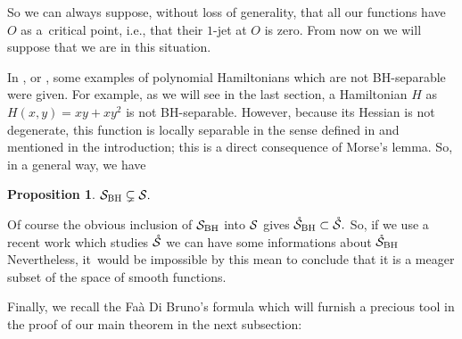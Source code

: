 \documentclass[pdftex]{sigma}%
\numberwithin{equation}{section}
\newtheorem{Proposition}[Theorem]{Proposition}
 { \theoremstyle{definition}
\newtheorem{Remark}[Theorem]{Remark} }
\begin{document}
So we can always suppose, without loss of generality, that all our functions have $O$ as a~critical point, i.e., that their $1$-jet at $O$ is zero.
From now on we will suppose that we are in this situation.

In \cite{Br,BrMoTu}, or \cite{Fe}, some examples of polynomial Hamiltonians which are not BH-separable were given. For example, as we will see in the last section, a Hamiltonian $H$ as
$H(x,y)=xy+xy^2$ is not BH-separable. However, because its Hessian is not degenerate, this function is locally separable in the sense defined in \cite{BouBr} and mentioned in the introduction; this is a direct consequence of Morse's lemma. So, in a general way, we have

\begin{Proposition}
	${\cal S}_{\rm BH}\subsetneq{\cal S}.$
\end{Proposition}

\begin{Remark}
	Of course the obvious inclusion of ${\cal S}_{\rm BH}$ into ${\cal S}$ gives
	$\mathring{\cal S}_{\rm BH}\subset\mathring{\cal S}.$
	So, if we use a recent work \cite{BouBr} which studies $\mathring{\cal S}$ we can have some informations about $\mathring{\cal S}_{\rm BH}$ Nevertheless, it~would be impossible by this mean to conclude that it is a meager subset of the space of smooth functions.
\end{Remark}


Finally, we recall the Fa\`a Di Bruno's formula \cite{AMM1, AMM2} which will furnish a precious tool in the proof of our main theorem in the next subsection:
\end{document}
